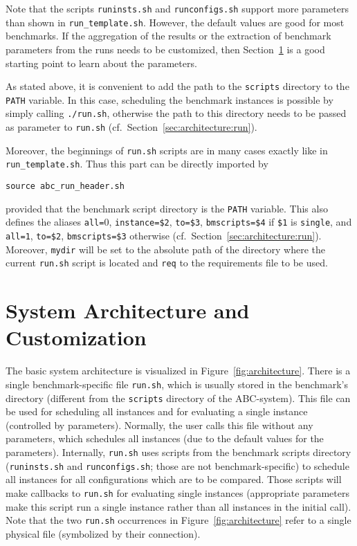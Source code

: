 \documentclass[a4paper]{article}
\newcommand{\abcs}{{ABC}}
\begin{document}
		Note that the scripts {\tt runinsts.sh} and {\tt runconfigs.sh} support more
		parameters than shown in {\tt run\_template.sh}.
		However, the default values are good for most benchmarks.
		If the aggregation of the results or
		the extraction of benchmark parameters from the runs needs to be customized,
		then Section~\ref{sec:architecture} is a good starting point to learn about the parameters.
		
		As stated above, it is convenient to add the path to the {\tt scripts} directory to the {\tt PATH} variable.
		In this case, scheduling the benchmark instances is possible by simply calling {\tt ./run.sh},
		otherwise the path to this directory needs to be passed as parameter to {\tt run.sh}
		(cf.~Section~\ref{sec:architecture:run}).

		Moreover, the beginnings of {\tt run.sh} scripts are in many cases exactly
		like in {\tt run\_template.sh}. Thus this part can be directly imported by
		\begin{center}
			{\tt source abc\_run\_header.sh}
		\end{center}
		provided that the benchmark script directory is the {\tt PATH} variable.
		This also defines the aliases
		{\tt all=$0$}, {\tt instance=\$2}, {\tt to=\$3}, {\tt bmscripts=\$4}
		if {\tt \$1} is {\tt single}, and
		{\tt all=1}, {\tt to=\$2}, {\tt bmscripts=\$3} otherwise (cf.~Section~\ref{sec:architecture:run}).
		Moreover, {\tt mydir} will be set to the absolute path of the directory where
		the current {\tt run.sh} script is located and {\tt req} to the requirements file to be used.
			
	\section{System Architecture and Customization}
	\label{sec:architecture}

		The basic system architecture is visualized in Figure~\ref{fig:architecture}.
		There is a single benchmark-specific file {\tt run.sh}, which is usually stored
		in the benchmark's directory (different from the {\tt scripts} directory of the \abcs-system).
		This file can be used for scheduling all instances and for evaluating a single instance
		(controlled by parameters). Normally, the user calls this file without any parameters,
		which schedules all instances (due to the default values for the parameters).
		Internally, {\tt run.sh} uses scripts from the benchmark scripts directory
		({\tt runinsts.sh} and {\tt runconfigs.sh}; those are not benchmark-specific) to schedule all instances for all configurations
		which are to be compared. Those scripts will make callbacks to {\tt run.sh} for evaluating single instances
		(appropriate parameters make this script run a single instance rather than all instances in the initial call).
		Note that the two {\tt run.sh} occurrences in Figure~\ref{fig:architecture} refer
		to a single physical file (symbolized by their connection).
		
\end{document}
